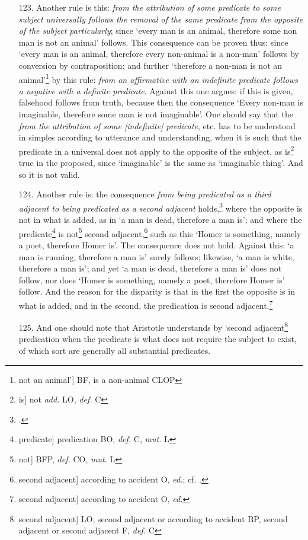 \begin{itemize}
\item[123.] Another rule is this: \textit{from the attribution of some predicate to some subject universally follows the removal of the same predicate from the opposite of the subject particularly}; since `every man is an animal, therefore some non man is not an animal' follows. This consequence can be proven thus: since `every man is an animal, therefore every non-animal is a non-man' follows by conversion by contraposition; and further `therefore a non-man is not an animal'\footnote{not an animal'] BF, is a non-animal CLOP} by this rule: \textit{from an affirmative with an indefinite predicate follows a negative with a definite predicate}. Against this one argues: if this is given, falsehood follows from truth, because then the consequence `Every non-man is imaginable, therefore some man is not imaginable'. One should say that the \textit{from the attribution of some [indefinite] predicate}, etc. has to be understood in simples according to utterance and understanding, when it is such that the predicate in a universal does not apply to the opposite of the subject, as is\footnote{is] not \textit{add.} LO, \textit{def.} C} true in the proposed, since `imaginable' is the same as `imaginable thing'. And so it is not valid.
\item[124.] Another rule is: the consequence \textit{from being predicated as a third adjacent to being predicated as a second adjacent} holds,\footnote{\cite[p. 57.36]{BurleyDPAL}.} where the opposite is not in what is added, as in `a man is dead, therefore a man is'; and where the predicate\footnote{predicate] predication BO, \textit{def.} C, \textit{mut.} L} is not\footnote{not] BFP, \textit{def.} CO, \textit{mut.} L} second adjacent,\footnote{second adjacent] according to accident O, \textit{ed.}; cf. \cite[pp. 119-120; 2.216]{Burley1973}.} such as this `Homer is something, namely a poet, therefore Homer is'. The consequence does not hold. Against this: `a man is running, therefore a man is' surely follows; likewise, `a man is white, therefore a man is'; and yet `a man is dead, therefore a man is' does not follow, nor does `Homer is something, namely a poet, therefore Homer is' follow. And the reason for the disparity is that in the first the opposite is in what is added, and in the second, the predication is second adjacent.\footnote{second adjacent] according to accident O, \textit{ed.}}
\item[125.] And one should note that Aristotle understands by `second adjacent\footnote{second adjacent] LO, second adjacent or according to accident BP, second adjacent or second adjacent F, \textit{def.} C} predication when the predicate is what does not require the subject to exist, of which sort are generally all substantial predicates.

\end{itemize}
